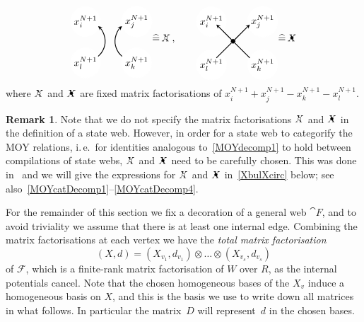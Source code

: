 \documentclass{compositio}
\theoremstyle{definition}
\newtheorem{remark}[theorem]{Remark}
\numberwithin{equation}{section}
\begin{document}
\begin{equation}
\label{MFcrossings}
\begin{tikzpicture}[scale=0.7,baseline, inner sep=1mm, >=stealth]
\node (1) at (-2.5,1.0) [circle,inner sep=1.5pt, draw=white,fill= white] {$x^{N+1}_{i}$};
\node (2) at (0.1,1.0) [circle,inner sep=1.5pt, draw=white,fill= white] {$x^{N+1}_{j}$};
\node (3) at (0.1,-1.1) [circle,inner sep=1.5pt, draw=white,fill= white] {$x^{N+1}_{k}$};
\node (3) at (-2.5,-1.1) [circle,inner sep=1.5pt, draw=white,fill= white] {$x^{N+1}_{l}$};
\draw[ ->, thick, shift={(-2.5,0)} ]  (-50:1) arc (-50:50:1); 
\draw[ ->, thick ] (230:1) arc (230:130:1); 
\end{tikzpicture}
\widehat = \,
\Xcirc \, ,
\qquad 
\begin{tikzpicture}[scale=0.7,baseline, inner sep=1mm, >=stealth]
\node (1) at (-1.1,1.0) [circle,inner sep=1.5pt, draw=white,fill= white] {$x^{N+1}_{i}$};
\node (2) at (1.5,1.0) [circle,inner sep=1.5pt, draw=white,fill= white] {$x^{N+1}_{j}$};
\node (3) at (1.5,-1.2) [circle,inner sep=1.5pt, draw=white,fill= white] {$x^{N+1}_{k}$};
\node (3) at (-1.1,-1.2) [circle,inner sep=1.5pt, draw=white,fill= white] {$x^{N+1}_{l}$};
\node (0) at (0,0) [circle,inner sep=1.5pt, thin,draw=black,fill= black] {};
\node (bl) at (-1,-1) [circle] {};
\node (br) at (1,-1) [circle] {};
\node (tl) at (-1,1) [circle] {};
\node (tr) at (1,1) [circle] {};
\draw[-,  thick] (bl) -- (0); 
\draw[-,  thick] (br) -- (0); 
\draw[->,  thick] (0) -- (tl); 
\draw[->,  thick] (0) -- (tr); 
\end{tikzpicture}
\widehat = \,
\Xbul
\end{equation}
where $\Xcirc$ and $\Xbul$ are fixed matrix factorisations of $x^{N+1}_{i}+x^{N+1}_{j}-x^{N+1}_{k}-x^{N+1}_{l}$. 

\begin{remark}
\label{MOYremark}
Note that we do not specify the matrix factorisations $\Xcirc$ and $\Xbul$ in the definition of a state web. However, in order for a state web to categorify the MOY relations, i.\,e.~for identities analogous to~\eqref{MOYdecomp1} to hold between compilations of state webs, $\Xcirc$ and $\Xbul$ need to be carefully chosen. This was done in~\cite{kr0401268} and we will give the expressions for $\Xcirc$ and $\Xbul$ in~\eqref{XbulXcirc} below; see also~\eqref{MOYcatDecomp1}--\eqref{MOYcatDecomp4}. 
\end{remark}

For the remainder of this section we fix a decoration of a general web $\cat{F}$, and to avoid triviality we assume that there is at least one internal edge. Combining the matrix factorisations at each vertex we have the \emph{total matrix factorisation}
$$
(X,d) = (X_{v_1},d_{v_1}) \otimes \ldots \otimes (X_{v_s},d_{v_s})
$$
of $\mathcal F$, which is a finite-rank matrix factorisation of $W$ over $R$, as the internal potentials cancel. Note that the chosen homogeneous bases of the $X_v$ induce a homogeneous basis on $X$, and this is the basis we use to write down all matrices in what follows. In particular the matrix~$D$ will represent~$d$ in the chosen bases. 
\end{document}
